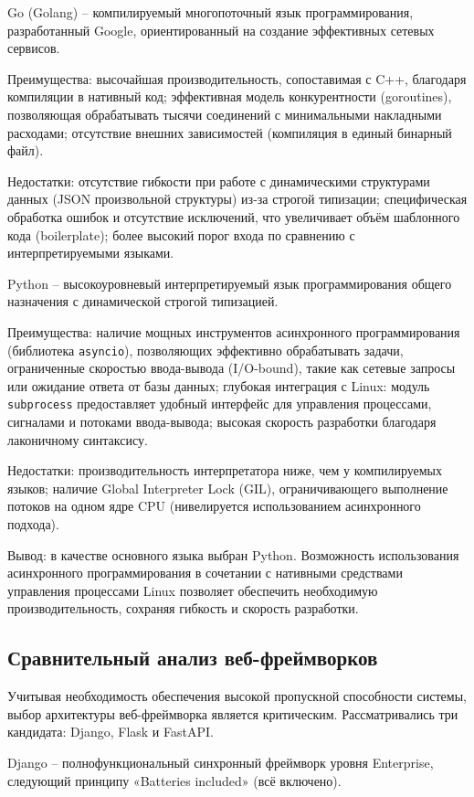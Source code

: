 Go (Golang) -- компилируемый многопоточный язык программирования, разработанный Google, ориентированный на создание эффективных сетевых сервисов.

Преимущества: высочайшая производительность, сопоставимая с C++, благодаря компиляции в нативный код; эффективная модель конкурентности (goroutines), позволяющая обрабатывать тысячи соединений с минимальными накладными расходами; отсутствие внешних зависимостей (компиляция в единый бинарный файл).

Недостатки: отсутствие гибкости при работе с динамическими структурами данных (JSON произвольной структуры) из-за строгой типизации; специфическая обработка ошибок и отсутствие исключений, что увеличивает объём шаблонного кода (boilerplate); более высокий порог входа по сравнению с интерпретируемыми языками.

Python -- высокоуровневый интерпретируемый язык программирования общего назначения с динамической строгой типизацией.

Преимущества: наличие мощных инструментов асинхронного программирования (библиотека \texttt{asyncio}), позволяющих эффективно обрабатывать задачи, ограниченные скоростью ввода-вывода (I/O-bound), такие как сетевые запросы или ожидание ответа от базы данных; глубокая интеграция с Linux: модуль \texttt{subprocess} предоставляет удобный интерфейс для управления процессами, сигналами и потоками ввода-вывода; высокая скорость разработки благодаря лаконичному синтаксису.

Недостатки: производительность интерпретатора ниже, чем у компилируемых языков; наличие Global Interpreter Lock (GIL), ограничивающего выполнение потоков на одном ядре CPU (нивелируется использованием асинхронного подхода).

Вывод: в качестве основного языка выбран Python. Возможность использования асинхронного программирования в сочетании с нативными средствами управления процессами Linux позволяет обеспечить необходимую производительность, сохраняя гибкость и скорость разработки.

\subsection{Сравнительный анализ веб-фреймворков}

Учитывая необходимость обеспечения высокой пропускной способности системы, выбор архитектуры веб-фреймворка является критическим. Рассматривались три кандидата: Django, Flask и FastAPI.

Django -- полнофункциональный синхронный фреймворк уровня Enterprise, следующий принципу «Batteries included» (всё включено).

